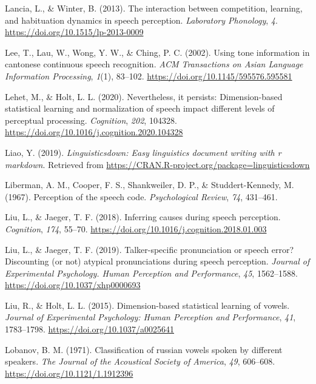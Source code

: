 \documentclass[
  11pt,
  man,floatsintext]{apa6}
\newlength{\cslhangindent}
\newlength{\cslentryspacingunit} %
\newenvironment{CSLReferences}[2] %
 {%
  \setlength{\parindent}{0pt}
  \ifodd #1
  \let\oldpar\par
  \def\par{\hangindent=\cslhangindent\oldpar}
  \fi
  \setlength{\parskip}{#2\cslentryspacingunit}
 }%
 {}
\begin{document}
\begin{CSLReferences}{1}{0}
\leavevmode{}%
Lancia, L., \& Winter, B. (2013). The interaction between competition, learning, and habituation dynamics in speech perception. \emph{Laboratory Phonology}, \emph{4}. \url{https://doi.org/10.1515/lp-2013-0009}

\leavevmode{}%
Lee, T., Lau, W., Wong, Y. W., \& Ching, P. C. (2002). Using tone information in cantonese continuous speech recognition. \emph{ACM Transactions on Asian Language Information Processing}, \emph{1}(1), 83--102. \url{https://doi.org/10.1145/595576.595581}

\leavevmode{}%
Lehet, M., \& Holt, L. L. (2020). Nevertheless, it persists: Dimension-based statistical learning and normalization of speech impact different levels of perceptual processing. \emph{Cognition}, \emph{202}, 104328. \url{https://doi.org/10.1016/j.cognition.2020.104328}

\leavevmode{}%
Liao, Y. (2019). \emph{Linguisticsdown: Easy linguistics document writing with r markdown}. Retrieved from \url{https://CRAN.R-project.org/package=linguisticsdown}

\leavevmode{}%
Liberman, A. M., Cooper, F. S., Shankweiler, D. P., \& Studdert-Kennedy, M. (1967). Perception of the speech code. \emph{Psychological Review}, \emph{74}, 431--461.

\leavevmode{}%
Liu, L., \& Jaeger, T. F. (2018). Inferring causes during speech perception. \emph{Cognition}, \emph{174}, 55--70. \url{https://doi.org/10.1016/j.cognition.2018.01.003}

\leavevmode{}%
Liu, L., \& Jaeger, T. F. (2019). Talker-specific pronunciation or speech error? Discounting (or not) atypical pronunciations during speech perception. \emph{Journal of Experimental Psychology. Human Perception and Performance}, \emph{45}, 1562--1588. \url{https://doi.org/10.1037/xhp0000693}

\leavevmode{}%
Liu, R., \& Holt, L. L. (2015). Dimension-based statistical learning of vowels. \emph{Journal of Experimental Psychology: Human Perception and Performance}, \emph{41}, 1783--1798. \url{https://doi.org/10.1037/a0025641}

\leavevmode{}%
Lobanov, B. M. (1971). Classification of russian vowels spoken by different speakers. \emph{The Journal of the Acoustical Society of America}, \emph{49}, 606--608. \url{https://doi.org/10.1121/1.1912396}


\end{CSLReferences}
\end{document}
